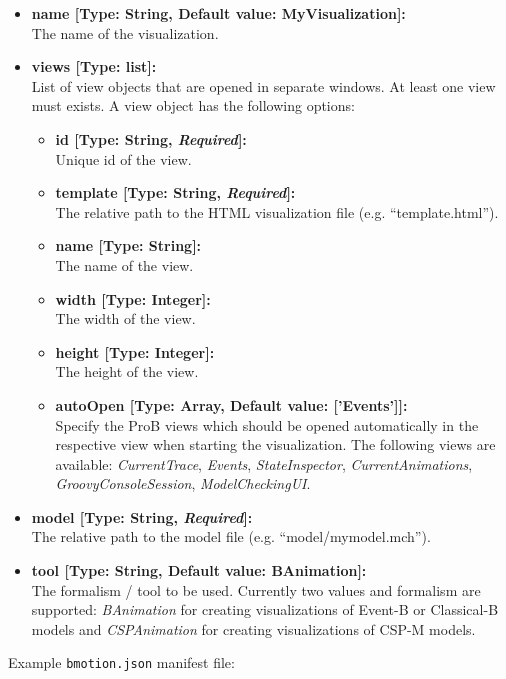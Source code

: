 \begin{itemize}
	\item[] \textbf{name [Type: String, Default value: MyVisualization]:}\\The name of the visualization. 
	\item[] \textbf{views [Type: list]:}\\ List of view objects that are opened in separate windows.
	At least one view must exists.
	A view object has the following options:
	\begin{itemize}
		\item[] \textbf{id [Type: String, \textit{Required}]:}\\ Unique id of the view.
		\item[] \textbf{template [Type: String, \textit{Required}]:}\\ The relative path to the HTML visualization file (e.g. ``template.html'').
		\item[] \textbf{name [Type: String]:}\\ The name of the view.
		\item[] \textbf{width [Type: Integer]:}\\ The width of the view.
		\item[] \textbf{height [Type: Integer]:}\\ The height of the view.
		\item[] \textbf{autoOpen [Type: Array, Default value: ['Events']]:}\\Specify the ProB views which should be opened automatically in the respective view when starting the visualization. 
The following views are available: \textit{CurrentTrace}, \textit{Events}, \textit{StateInspector}, \textit{CurrentAnimations}, \textit{GroovyConsoleSession}, \textit{ModelCheckingUI}.
	\end{itemize}
	\item[] \textbf{model [Type: String, \textit{Required}]:}\\The relative path to the model file (e.g. ``model/mymodel.mch'').
	\item[] \textbf{tool [Type: String, Default value: BAnimation]:}\\The formalism / tool to be used. Currently two values and formalism are supported: \textit{BAnimation} for creating visualizations of Event-B or Classical-B models and \textit{CSPAnimation} for creating visualizations of CSP-M models.
\end{itemize}

Example \texttt{bmotion.json} manifest file:

